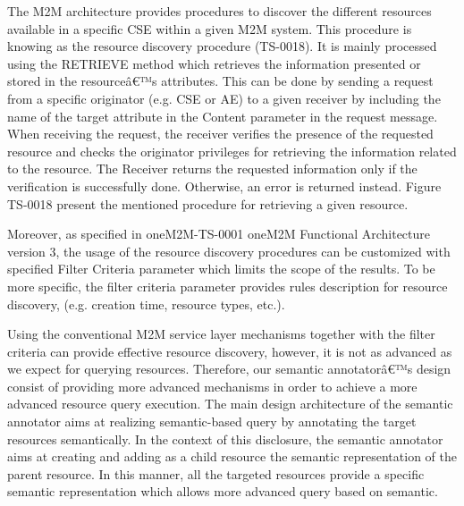 The M2M architecture provides procedures to discover the different resources available in a specific CSE within a given M2M system. This procedure is knowing as the resource discovery procedure (TS-0018). It is mainly processed using the RETRIEVE method which retrieves the information presented or stored in the resourceâ€™s attributes. This can be done by sending a request from a specific originator (e.g. CSE or AE) to a given receiver by including the name of the target attribute in the Content parameter in the request message. When receiving the request, the receiver verifies the presence of the requested resource and checks the originator privileges for retrieving the information related to the resource. The Receiver returns the requested information only if the verification is successfully done. Otherwise, an error is returned instead. Figure TS-0018 present the mentioned procedure for retrieving a given resource.\par
Moreover, as specified in oneM2M-TS-0001 oneM2M Functional Architecture version 3, the usage of the resource discovery procedures can be customized with specified Filter Criteria parameter which limits the scope of the results. To be more specific, the filter criteria parameter provides rules description for resource discovery, (e.g. creation time, resource types, etc.).\par
Using the conventional M2M service layer mechanisms together with the filter criteria can provide effective resource discovery, however, it is not as advanced as we expect for querying resources. Therefore, our semantic annotatorâ€™s design consist of providing more advanced mechanisms in order to achieve a more advanced resource query execution. The main design architecture of the semantic annotator aims at realizing semantic-based query by annotating the target resources semantically. In the context of this disclosure, the semantic annotator aims at creating and adding as a child resource the semantic representation of the parent resource. In this manner, all the targeted resources provide a specific semantic representation which allows more advanced query based on semantic.\par
